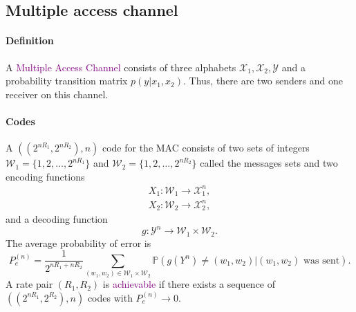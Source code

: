 \documentclass[a4paper, 11pt, openany]{book}
\numberwithin{equation}{section}
\theoremstyle{plain}
\theoremstyle{definition}
\newcommand{\probability}{\mathbb{P}}
\newcommand{\Define}[1]{\textcolor{purple}{#1}}
\newcommand{\alphabet}[1]{\mathcal{#1}}
\begin{document}
\subsection{Multiple access channel}

\paragraph{Definition}

A \Define{Multiple Access Channel} consists of three alphabets $\alphabet{X}_1, \alphabet{X}_2, \alphabet{Y}$ and a probability transition matrix $p(y | x_1, x_2)$. Thus, there are two senders and one receiver on this channel.


\begin{center}
\end{center}

\paragraph{Codes}

A $((2^{nR_1}, 2^{nR_2}), n  )$ code for the MAC consists of two sets of integers $\alphabet{W}_1 = \{ 1, 2, \dots, 2^{nR_1} \}$ and $\alphabet{W}_2 = \{ 1, 2, \dots, 2^{nR_2} \}$ called the messages sets and two encoding functions
\begin{align*}
	X_1 : \alphabet{W}_1 \to \alphabet{X}_1^n,\\
	X_2 : \alphabet{W}_2 \to \alphabet{X}_2^n,
\end{align*}
and a decoding function 
\[
	g: \alphabet{Y}^n \to \alphabet{W}_1 \times \alphabet{W}_2.
\]
The average probability of error is
\[
	P_e^{(n)} = \frac{1}{2^{nR_1 + nR_2}} \sum_{(w_1, w_2) \in \alphabet{W}_1 \times \alphabet{W}_2} \probability( g(Y^n) \ne (w_1, w_2) | (w_1, w_2) \text{ was sent} ).
\]
A rate pair $(R_1, R_2)$ is \Define{achievable} if there exists a sequence of $((2^{nR_1}, 2^{R_2}), n  )$ codes with $P_e^{(n)} \to 0$.
\end{document}

